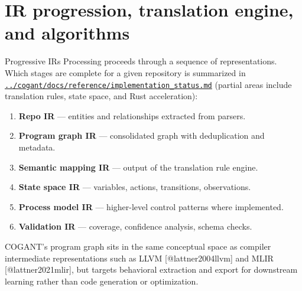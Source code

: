\documentclass[
  ignorenonframetext,
]{beamer}
\author{\texorpdfstring{}{}}
\date{}
\providecommand{\tightlist}{%
  \setlength{\itemsep}{0pt}\setlength{\parskip}{0pt}}
\begin{document}
\section{IR progression, translation engine, and
algorithms}\label{ir-progression-translation-engine-and-algorithms}

\begin{frame}[fragile]{Progressive IRs}
\protect{}\label{progressive-irs}
Processing proceeds through a sequence of representations. Which stages
are complete for a given repository is summarized in
\href{../cogant/docs/reference/implementation_status.md}{\texttt{../cogant/docs/reference/implementation\_status.md}}
(partial areas include translation rules, state space, and Rust
acceleration):

\begin{enumerate}
\tightlist
\item
  \textbf{Repo IR} --- entities and relationships extracted from
  parsers.
\item
  \textbf{Program graph IR} --- consolidated graph with deduplication
  and metadata.
\item
  \textbf{Semantic mapping IR} --- output of the translation rule
  engine.
\item
  \textbf{State space IR} --- variables, actions, transitions,
  observations.
\item
  \textbf{Process model IR} --- higher-level control patterns where
  implemented.
\item
  \textbf{Validation IR} --- coverage, confidence analysis, schema
  checks.
\end{enumerate}

COGANT's program graph sits in the same conceptual space as compiler
intermediate representations such as LLVM {[}@lattner2004llvm{]} and
MLIR {[}@lattner2021mlir{]}, but targets behavioral extraction and
export for downstream learning rather than code generation or
optimization.
\end{frame}
\end{document}
